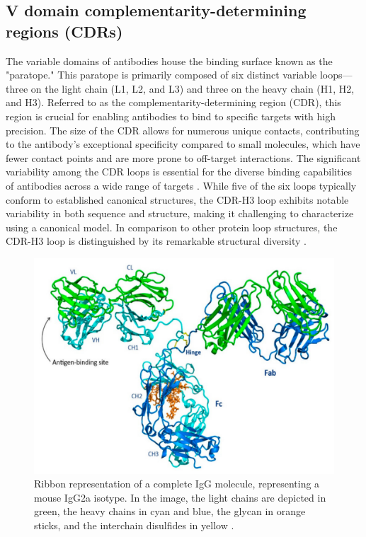 \subsection{V domain complementarity-determining regions (CDRs)}

The variable domains of antibodies house the binding surface known as the "paratope." This paratope is primarily composed of six distinct variable loops—three on the light chain (L1, L2, and L3) and three on the heavy chain (H1, H2, and H3). Referred to as the complementarity-determining region (CDR), this region is crucial for enabling antibodies to bind to specific targets with high precision. The size of the CDR allows for numerous unique contacts, contributing to the antibody's exceptional specificity compared to small molecules, which have fewer contact points and are more prone to off-target interactions. The significant variability among the CDR loops is essential for the diverse binding capabilities of antibodies across a wide range of targets \citep{Graves2020}. While five of the six loops typically conform to established canonical structures, the CDR-H3 loop exhibits notable variability in both sequence and structure, making it challenging to characterize using a canonical model. In comparison to other protein loop structures, the CDR-H3 loop is distinguished by its remarkable structural diversity \citep{Melnyk2023}.


\begin{figure}[h]
 \centering
 \includegraphics[width=12cm]{images/antibody_structure.png}
 \caption{Ribbon representation of a complete IgG molecule, representing a mouse IgG2a isotype. In the image, the light chains are depicted in green, the heavy chains in cyan and blue, the glycan in orange sticks, and the interchain disulfides in yellow \citep{Chiu2019}.}
 \label{antibody_structure}
\end{figure}


